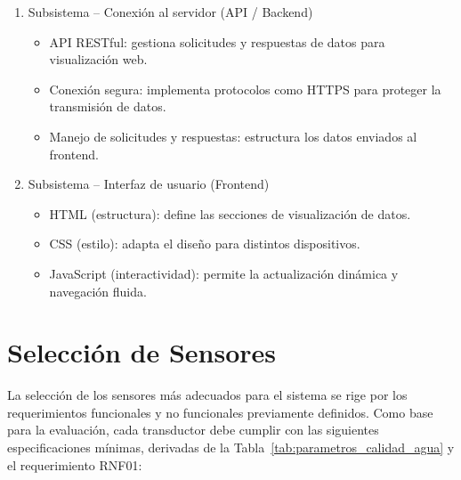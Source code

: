\begin{enumerate}
    \item Subsistema – Conexión al servidor (API / Backend)
    \begin{itemize}
        \item API RESTful: gestiona solicitudes y respuestas de datos para visualización web.
        \item Conexión segura: implementa protocolos como HTTPS para proteger la transmisión de datos.
        \item Manejo de solicitudes y respuestas: estructura los datos enviados al frontend.
    \end{itemize}

    \item Subsistema – Interfaz de usuario (Frontend)
    \begin{itemize}
        \item HTML (estructura): define las secciones de visualización de datos.
        \item CSS (estilo): adapta el diseño para distintos dispositivos.
        \item JavaScript (interactividad): permite la actualización dinámica y navegación fluida.
    \end{itemize}
\end{enumerate}










\section{Selección de Sensores}

La selección de los sensores más adecuados para el sistema se rige por los requerimientos funcionales y no funcionales previamente definidos. Como base para la evaluación, cada transductor debe cumplir con las siguientes especificaciones mínimas, derivadas de la Tabla~\ref{tab:parametros_calidad_agua} y el requerimiento RNF01:


